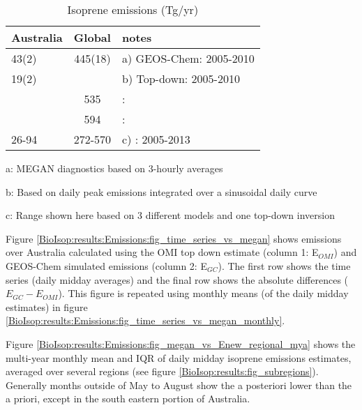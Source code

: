     \begin{table}\begin{threeparttable}
      \caption{Isoprene emissions (Tg/yr)}
      \begin{tabular}{ l  c  >{\arraybackslash}p{10cm} } 
        \toprule
        Australia & Global & notes \\
        \midrule
        43(2) & 445(18) & a) GEOS-Chem: 2005-2010 \\
        19(2) &  & b) Top-down: 2005-2010 \\
         &  535 & \textcite{Guenther2012}: \\
         &  594 & \textcite{Sindelarova2014}: \\
        26-94 & 272-570 & c) \textcite{Bauwens2016}: 2005-2013\\
        \bottomrule
      \end{tabular}
      \begin{tablenotes} 
        \item a: MEGAN diagnostics based on 3-hourly averages
        \item b: Based on daily peak emissions integrated over a sinusoidal daily curve
        \item c: Range shown here based on 3 different models and one top-down inversion
      \end{tablenotes}
      \label{BioIsop:results:Emissions:tab_emissions_Tg}
    \end{threeparttable}\end{table}
     
    
    Figure \ref{BioIsop:results:Emissions:fig_time_series_vs_megan} shows emissions over Australia calculated using the OMI top down estimate (column 1: E$_{OMI}$) and GEOS-Chem simulated emissions (column 2: E$_{GC}$).
    The first row shows the time series (daily midday averages) and the final row shows the absolute differences ($E_{GC} - E_{OMI}$). %
    This figure is repeated using monthly means (of the daily midday estimates) in figure \ref{BioIsop:results:Emissions:fig_time_series_vs_megan_monthly}.
    
    Figure \ref{BioIsop:results:Emissions:fig_megan_vs_Enew_regional_mya} shows the multi-year monthly mean and IQR of daily midday isoprene emissions estimates, averaged over several regions (see figure \ref{BioIsop:results:fig_subregions}). 
    Generally months outside of May to August show the a posteriori lower than the a priori, except in the south eastern portion of Australia.
    
